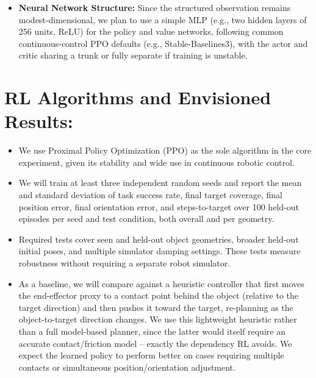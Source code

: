 \documentclass[11pt,onecolumn]{IEEEtran}
\begin{document}
\begin{itemize}
    \item
    \textbf{Neural Network Structure:}
    Since the structured observation remains modest-dimensional, we plan to use
    a simple MLP (e.g., two hidden layers of 256 units, ReLU) for the policy and
    value networks, following common continuous-control PPO defaults (e.g.,
    Stable-Baselines3), with the actor and critic sharing a trunk or fully
    separate if training is unstable.

\end{itemize}



\section*{RL Algorithms and Envisioned Results:}

\begin{itemize}

    \item
    We use Proximal Policy Optimization (PPO) as the sole algorithm in the core
    experiment, given its stability and wide use in continuous robotic control.

    \item
    We will train at least three independent random seeds and report the mean and
    standard deviation of task success rate, final target coverage, final
    position error, final orientation error, and steps-to-target over 100
    held-out episodes per seed and test condition, both overall and per
    geometry.

    \item
    Required tests cover seen and held-out object geometries, broader held-out
    initial poses, and multiple simulator damping settings. These tests measure
    robustness without requiring a separate robot simulator.

    \item
    As a baseline, we will compare against a heuristic controller that first
    moves the end-effector proxy to a contact point behind the object (relative
    to the target direction) and then pushes it toward the target, re-planning
    as the object-to-target direction changes. We use this lightweight heuristic
    rather than a full model-based planner, since the latter would itself
    require an accurate contact/friction model -- exactly the dependency RL
    avoids. We expect the learned policy to perform better on cases requiring
    multiple contacts or simultaneous position/orientation adjustment.

\end{itemize}
\end{document}
